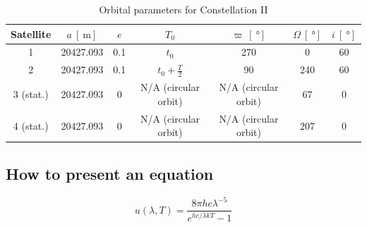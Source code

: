 \begin{table}[H]
    \centering
    \caption{Orbital parameters for Constellation II}
    \label{tab:1}
    \begin{tabular}{|c|c|c|c|c|c|c|}
        \hline
        Satellite & $a \ [\SI{}{\meter}]$ & $e$  & $T_0$                 & $\varpi \ [\SI{}{\degree}]$ & $\Omega \ [\SI{}{\degree}]$ & $i \ [\SI{}{\degree}]$ \\ \hline
        1        & 20427.093             & 0.1 & $t_0$                 & 270                          & 0         & 60    \\ \hline
        2        & 20427.093             & 0.1 & $t_0 + \frac{T}{2}$   & 90                           & 240       & 60    \\ \hline
        3 (stat.) & 20427.093             & 0 &  N/A (circular orbit)  &  N/A (circular orbit)       & 67        & 0    \\ \hline
        4 (stat.) & 20427.093             & 0    & N/A (circular orbit) & N/A (circular orbit)       & 207       & 0     \\ \hline
    \end{tabular}
\end{table}

\subsection{How to present an equation}

\begin{equation}
    u(\lambda,T)=\frac{8\pi hc\lambda^{-5}}{e^{hc/\lambda kT}-1}
    \label{eq:1}
\end{equation}
